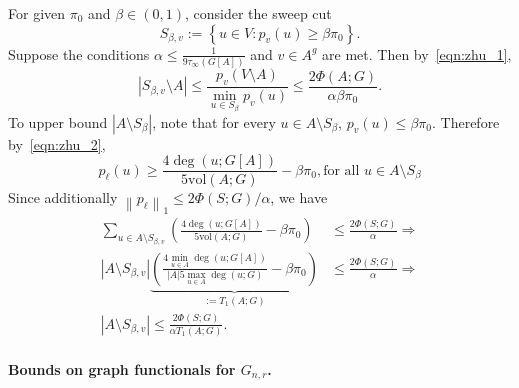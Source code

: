 \documentclass[11pt,twoside]{article}
\newcommand{\set}[1]{\left\{#1\right\}}
\newcommand{\vol}{\mathrm{vol}}
\newcommand{\abs}[1]{\left \lvert #1 \right \rvert}
\newcommand{\norm}[1]{\left\lVert#1\right\rVert}
\newcommand{\1}{\mathbf{1}}
\begin{document}
For given $\pi_0$ and $\beta \in (0,1)$, consider the sweep cut
\begin{equation*}
S_{\beta,v} := \set{u \in V: p_v(u) \geq \beta \pi_0}.
\end{equation*}
Suppose the conditions $\alpha \leq \frac{1}{9\tau_{\infty}(G[A])}$ and $v \in A^g$ are met. Then by~\eqref{eqn:zhu_1},
\begin{equation}
\label{eqn:zhu_3}
\abs{S_{\beta,v} \setminus A} \leq \frac{p_v(V \setminus A)}{\min_{u \in S_{\beta}}p_v(u)} \leq \frac{2 \Phi(A;G)}{\alpha \beta \pi_0}. 
\end{equation}
To upper bound $\abs{A \setminus S_{\beta}}$, note that for every $u \in A \setminus S_{\beta}$, $p_v(u) \leq \beta \pi_0$. Therefore by~\eqref{eqn:zhu_2},
\begin{equation*}
p_{\ell}(u) \geq \frac{4\deg(u;G[A])}{5\vol(A;G)} - \beta\pi_0, \textrm{for all $u \in A \setminus S_{\beta}$}
\end{equation*}
Since additionally $\norm{p_{\ell}}_1 \leq 2\Phi(S;G)/\alpha$, we have
\begin{align}
\sum_{u \in A \setminus S_{\beta,v}} \left(\frac{4\deg(u;G[A])}{5\vol(A;G)} - \beta\pi_0\right) & \leq \frac{2\Phi(S;G)}{\alpha} \nonumber \Longrightarrow\\
\abs{A \setminus S_{\beta,v}}\underbrace{\left(\frac{4\min_{u \in A}\deg(u;G[A])}{\abs{A}5\max_{u \in A}\deg(u;G)} - \beta\pi_0\right)}_{:=T_1(A;G)} & \leq \frac{2\Phi(S;G)}{\alpha} \Longrightarrow \nonumber \\
\abs{A \setminus S_{\beta,v}} \leq \frac{2\Phi(S;G)}{\alpha T_1(A;G)} .
\label{eqn:zhu_4}
\end{align}

\paragraph{Bounds on graph functionals for $G_{n,r}$.}
\end{document}
